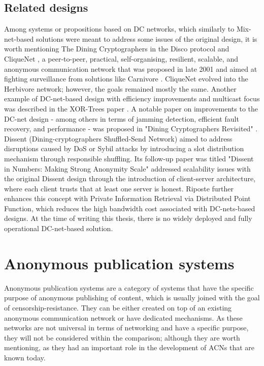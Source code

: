 \subsection{Related designs}
Among systems or propositions based on DC networks, which similarly to Mix-net-based solutions were meant to address some issues of the original design, it is worth mentioning The Dining Cryptographers in the Disco protocol \cite{dc-disco} and CliqueNet \cite{clique-net}, a peer-to-peer, practical, self-organising, resilient, scalable, and anonymous communication network that was proposed in late 2001 and aimed at fighting surveillance from solutions like Carnivore \cite{carnivore}. CliqueNet evolved into the Herbivore \cite{herbivore} network; however, the goals remained mostly the same. Another example of DC-net-based design with efficiency improvements and multicast focus was described in the XOR-Trees paper \cite{xor-trees}. A notable paper on improvements to the DC-net design - among others in terms of jamming detection, efficient fault recovery, and performance - was proposed in "Dining Cryptographers Revisited" \cite{dc-revisited}. Dissent (Dining-cryptographers Shuffled-Send Network) \cite{dissent} aimed to address disruptions caused by DoS or Sybil attacks by introducing a slot distribution mechanism through responsible shuffling. Its follow-up paper was titled "Dissent in Numbers: Making Strong Anonymity Scale" \cite{dissent2} addressed scalability issues with the original Dissent design through the introduction of client-server architecture, where each client trusts that at least one server is honest. Riposte \cite{riposte} further enhances this concept with Private Information Retrieval via Distributed Point Function, which reduces the high bandwidth cost associated with DC-nets-based designs. At the time of writing this thesis, there is no widely deployed and fully operational DC-net-based solution.



\section{Anonymous publication systems}
Anonymous publication systems are a category of systems that have the specific purpose of anonymous publishing of content, which is usually joined with the goal of censorship-resistance. They can be either created on top of an existing anonymous communication network or have dedicated mechanisms. As these networks are not universal in terms of networking and have a specific purpose, they will not be considered within the comparison; although they are worth mentioning, as they had an important role in the development of ACNs that are known today.

